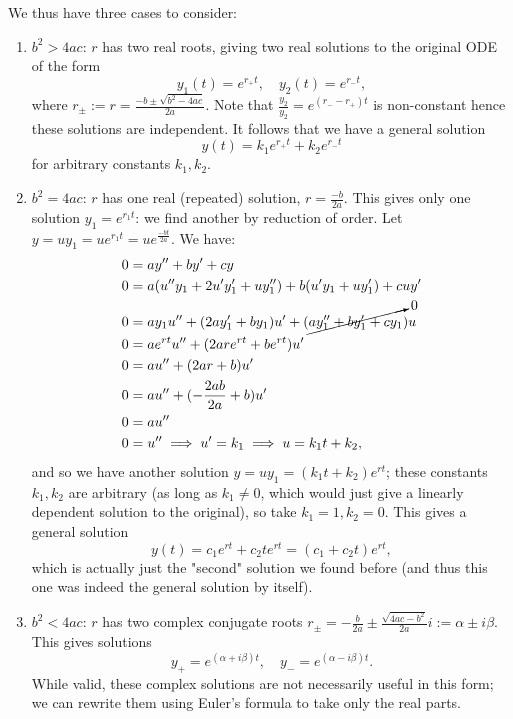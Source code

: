 We thus have three cases to consider:
\begin{enumerate}
    \item $b^2 > 4ac$: $r$ has two real roots, giving two real solutions to the original ODE of the form \[
    y_1(t) = e^{r_+t}, \quad y_2(t) = e^{r_-t},    
    \]
    where $r_{\pm} := r= \frac{-b \pm \sqrt{b^2 - 4ac}}{2a}$. Note that $\frac{y_2}{y_2} = e^{(r_- - r_+)t}$ is non-constant hence these solutions are independent. It follows that we have a general solution \[
    y(t) = k_1e^{r_+t}+k_2e^{r_-t}    
    \]
    for arbitrary constants $k_1, k_2$.
    \item $b^2 = 4ac$: $r$ has one real (repeated) solution, $r = \frac{-b}{2a}$. This gives only one solution $y_1 = e^{r_1 t}$: we find another by reduction of order. Let $y = uy_1 = ue^{r_1t} = ue^{\frac{-bt}{2a}}$. We have:
    \begin{align*}
        0 &= ay'' + by' + cy\\
        0&= a(u''y_1+2u'y_1'+uy_1'')+b(u'y_1+uy_1')+cuy'\\
        0&=ay_1u''+(2ay_1'+by_1)u'+(\cancelto{0}{ay_1''+by_1'+cy_1})u\\
        0&= ae^{r t}u'' + (2a re^{rt} + b e^{rt})u'\\
        0&= au'' + (2ar + b)u'\\
        0&= au'' + (- \frac{2ab}{2a} + b)u'\\
        0&= au''\\
        0&= u'' \implies u' = k_1 \implies u = k_1t + k_2,
    \end{align*}
    and so we have another solution $y = uy_1 = (k_1 t + k_2)e^{r t}$; these constants $k_1, k_2$ are arbitrary (as long as $k_1 \neq 0$, which would just give a linearly dependent solution to the original), so take $k_1 = 1, k_2 = 0$. This gives a general solution
    \[
        y(t) = c_1e^{rt} + c_2te^{rt} = (c_1+c_2t)e^{rt},
    \]
    which is actually just the "second" solution we found before (and thus this one was indeed the general solution by itself).
    
    \item $b^2 < 4ac$: $r$ has two complex conjugate roots $r_\pm = - \frac{b}{2a} \pm \frac{\sqrt{4ac-b^2}}{2a}i := \alpha \pm i \beta$. This gives solutions \[
    y_+ = e^{(\alpha + i \beta )t}, \quad y_- = e^{(\alpha - i \beta)t}.
    \]
    While valid, these complex solutions are not necessarily useful in this form; we can rewrite them using Euler's formula to take only the real parts.


\end{enumerate}
